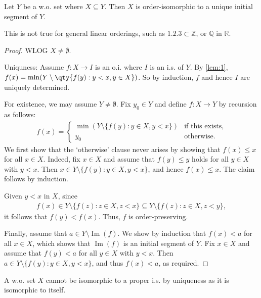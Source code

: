 \begin{proposition} \label{prp:sbs}
    Let $Y$ be a w.o. set where $X \subseteq Y$.
    Then $X$ is order-isomorphic to a unique initial segment of $Y$.
\end{proposition}
This is not true for general linear orderings, such as $\qty{1, 2, 3} \subset \mathbb Z$, or $\mathbb Q$ in $\mathbb R$.
\begin{proof}
    WLOG $X \neq \emptyset$.

    Uniquness: Assume $f : X \to I$ is an o.i. where $I$ is an i.s. of $Y$.
    By \cref{lem:1}, $f(x) = \min(Y \setminus \qty{f(y) : y < x, y \in X})$.
    So by induction, $f$ and hence $I$ are uniquely determined.

    For existence, we may assume $Y \neq \emptyset$. Fix $y_0 \in Y$ and define $f : X \to Y$ by recursion as follows:
    \begin{align*}
        f(x) =
        \begin{cases}
        \min \left( Y \setminus \{f(y) : y \in X, y < x\} \right) & \text{if this exists,} \\
        y_0 & \text{otherwise.}
        \end{cases}
    \end{align*}
    We first show that the `otherwise' clause never arises by showing that $f(x) \leq x$ for all $x \in X$. Indeed, fix $x \in X$ and assume that $f(y) \leq y$ holds for all $y \in X$ with $y < x$. Then $x \in Y \setminus \{f(y) : y \in X, y < x\}$, and hence $f(x) \leq x$. The claim follows by induction.

    Given $y < x$ in $X$, since
    \begin{align*}
        f(x) \in Y \setminus \{f(z) : z \in X, z < x\} \subseteq Y \setminus \{f(z) : z \in X, z < y\},
    \end{align*}
    it follows that $f(y) < f(x)$. Thus, $f$ is order-preserving.

    Finally, assume that $a \in Y \setminus \operatorname{Im}(f)$. We show by induction that $f(x) < a$ for all $x \in X$, which shows that $\operatorname{Im}(f)$ is an initial segment of $Y$. Fix $x \in X$ and assume that $f(y) < a$ for all $y \in X$ with $y < x$. Then $a \in Y \setminus \{f(y) : y \in X, y < x\}$, and thus $f(x) < a$, as required.
\end{proof}

\begin{remark}
    A w.o. set $X$ cannot be isomorphic to a proper i.s. by uniqueness as it is isomorphic to itself.
\end{remark}

